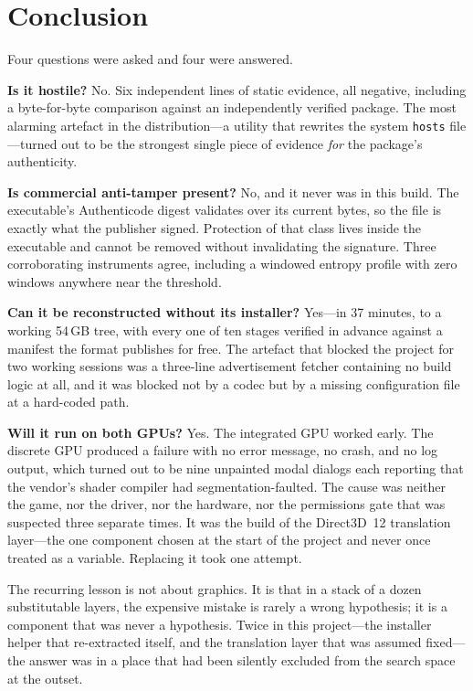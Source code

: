 \section{Conclusion}
\label{sec:conclusion}

Four questions were asked and four were answered.

\textbf{Is it hostile?} No. Six independent lines of static evidence, all
negative, including a byte-for-byte comparison against an independently verified
package. The most alarming artefact in the distribution---a utility that rewrites
the system \verb|hosts| file---turned out to be the strongest single piece of
evidence \emph{for} the package's authenticity.

\textbf{Is commercial anti-tamper present?} No, and it never was in this build.
The executable's Authenticode digest validates over its current bytes, so the
file is exactly what the publisher signed. Protection of that class lives inside
the executable and cannot be removed without invalidating the signature.
Three corroborating instruments agree, including a windowed entropy profile with
zero windows anywhere near the threshold.

\textbf{Can it be reconstructed without its installer?} Yes---in 37 minutes, to a
working 54\,GB tree, with every one of ten stages verified in advance against a
manifest the format publishes for free. The artefact that blocked the project for
two working sessions was a three-line advertisement fetcher containing no build
logic at all, and it was blocked not by a codec but by a missing configuration
file at a hard-coded path.

\textbf{Will it run on both GPUs?} Yes. The integrated GPU worked early. The
discrete GPU produced a failure with no error message, no crash, and no log
output, which turned out to be nine unpainted modal dialogs each reporting that
the vendor's shader compiler had segmentation-faulted. The cause was neither the
game, nor the driver, nor the hardware, nor the permissions gate that was
suspected three separate times. It was the build of the Direct3D~12 translation
layer---the one component chosen at the start of the project and never once
treated as a variable. Replacing it took one attempt.

The recurring lesson is not about graphics. It is that in a stack of a dozen
substitutable layers, the expensive mistake is rarely a wrong hypothesis; it is a
component that was never a hypothesis. Twice in this project---the installer
helper that re-extracted itself, and the translation layer that was assumed
fixed---the answer was in a place that had been silently excluded from the search
space at the outset.

